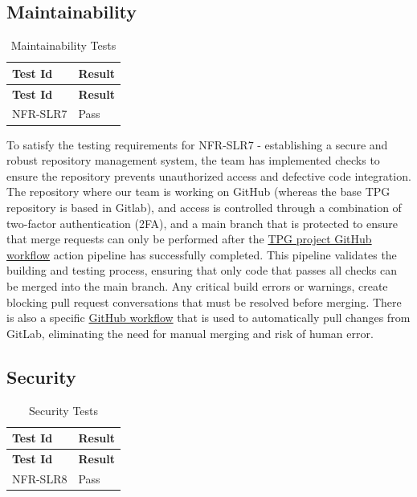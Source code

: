 \documentclass[12pt, titlepage]{article}
\begin{document}
\subsection{Maintainability}\label{maintainability}

  \begin{center}
  \begin{longtable}{|p{4cm}|p{4cm}|}
  \caption{Maintainability Tests} \\
  \hline
  \textbf{Test Id} & \textbf{Result} \\
  \hline
  \endfirsthead
  \hline
  \textbf{Test Id} & \textbf{Result} \\
  \hline
  \endhead
  NFR-SLR7 & Pass \\
  \hline
  \end{longtable}
\end{center}

To satisfy the testing requirements for NFR-SLR7 - establishing a secure and robust repository management system, the team has implemented checks to ensure the repository prevents unauthorized access and defective code integration. The repository where our team is working on GitHub (whereas the base TPG repository is based in Gitlab), and access is controlled through a combination of two-factor authentication (2FA), and a main branch that is protected to ensure that merge requests can only be performed after the \href{https://github.com/TPGEngine/tpg/blob/main/.github/workflows/build-project.yaml}{TPG project GitHub workflow} action pipeline has successfully completed. This pipeline validates the building and testing process, ensuring that only code that passes all checks can be merged into the main branch. Any critical build errors or warnings, create blocking pull request conversations that must be resolved before merging. There is also a specific \href{https://github.com/TPGEngine/tpg/blob/main/.github/workflows/pull-gitlab.yml}{GitHub workflow} that is used to automatically pull changes from GitLab, eliminating the need for manual merging and risk of human error. 

\subsection{Security}\label{security}

\begin{center}
  \begin{longtable}{|p{4cm}|p{4cm}|}
  \caption{Security Tests} \\
  \hline
  \textbf{Test Id} & \textbf{Result} \\
  \hline
  \endfirsthead
  \hline
  \textbf{Test Id} & \textbf{Result} \\
  \hline
  \endhead
  NFR-SLR8 & Pass \\
  \hline
  \end{longtable}
\end{center}
\end{document}
